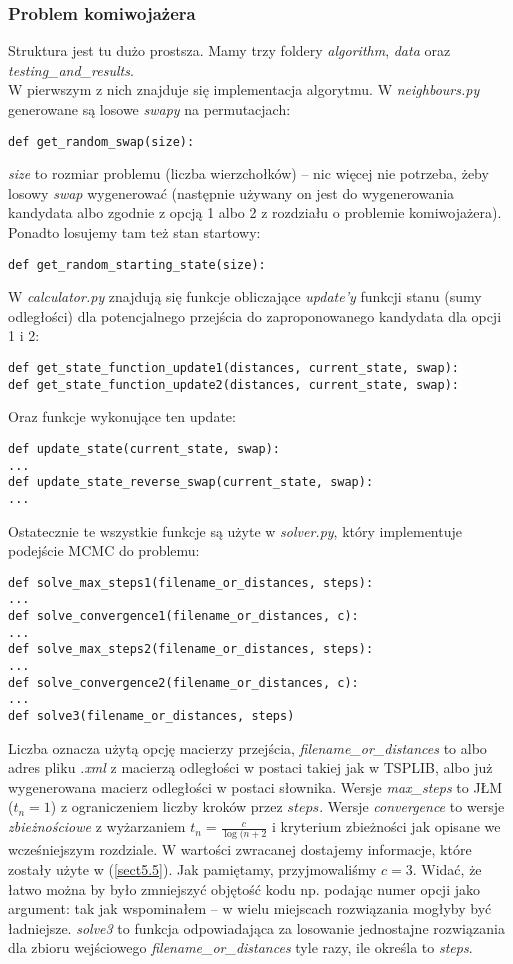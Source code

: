\documentclass[a4paper]{article}
\theoremstyle{defn}
\theoremstyle{theorem}
\theoremstyle{lemma}
\theoremstyle{cor}
\theoremstyle{fact}
\begin{document}
\subsubsection{Problem komiwojażera}
Struktura jest tu dużo prostsza. Mamy trzy foldery \textit{algorithm}, \textit{data} oraz \textit{testing\_and\_results}.\\
W pierwszym z nich znajduje się implementacja algorytmu. W \textit{neighbours.py} generowane są losowe \textit{swapy} na permutacjach:
\begin{lstlisting}
def get_random_swap(size):
\end{lstlisting}
\textit{size} to rozmiar problemu (liczba wierzchołków) – nic więcej nie potrzeba, żeby losowy \textit{swap} wygenerować (następnie używany on jest do wygenerowania kandydata albo zgodnie z opcją 1 albo 2 z rozdziału o problemie komiwojażera). Ponadto losujemy tam też stan startowy:
\begin{lstlisting}
def get_random_starting_state(size):
\end{lstlisting}
W \textit{calculator.py} znajdują się funkcje obliczające \textit{update'y} funkcji stanu (sumy odległości) dla potencjalnego przejścia do zaproponowanego kandydata dla opcji 1 i 2:
\begin{lstlisting}
def get_state_function_update1(distances, current_state, swap):
def get_state_function_update2(distances, current_state, swap):
\end{lstlisting}
Oraz funkcje wykonujące ten update:
\begin{lstlisting}
def update_state(current_state, swap):
...
def update_state_reverse_swap(current_state, swap):
...
\end{lstlisting}
Ostatecznie te wszystkie funkcje są użyte w \textit{solver.py}, który implementuje podejście MCMC do problemu:
\begin{lstlisting}
def solve_max_steps1(filename_or_distances, steps):
...
def solve_convergence1(filename_or_distances, c):
...
def solve_max_steps2(filename_or_distances, steps):
...
def solve_convergence2(filename_or_distances, c):
...
def solve3(filename_or_distances, steps)
\end{lstlisting}
Liczba oznacza użytą opcję macierzy przejścia, \textit{filename\_or\_distances} to albo adres pliku \textit{.xml} z macierzą odległości w postaci takiej jak w TSPLIB, albo już wygenerowana macierz odległości w postaci słownika. Wersje \textit{max\_steps} to JŁM ($t_n=1$) z ograniczeniem liczby kroków przez $steps$. Wersje \textit{convergence} to wersje \textit{zbieżnościowe} z wyżarzaniem $t_n=\frac{c}{\log(n+2}$ i kryterium zbieżności jak opisane we wcześniejszym rozdziale. W wartości zwracanej dostajemy informacje, które zostały użyte w (\ref{sect5.5}). Jak pamiętamy, przyjmowaliśmy $c=3$. Widać, że łatwo można by było zmniejszyć objętość kodu np. podając numer opcji jako argument: tak jak wspominałem – w wielu miejscach rozwiązania mogłyby być ładniejsze. \textit{solve3} to funkcja odpowiadająca za losowanie jednostajne rozwiązania dla zbioru wejściowego \textit{filename\_or\_distances} tyle razy, ile określa to \textit{steps}.\\
\end{document}
